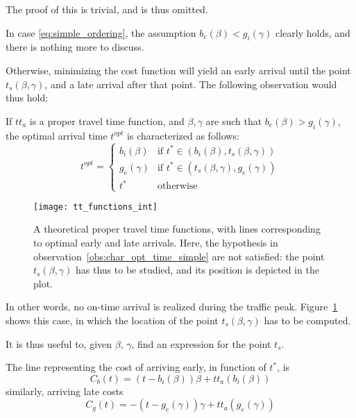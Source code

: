 The proof of this is trivial, and is thus omitted.

In case \eqref{eq:simple_ordering}, the assumption \(b_e(\beta) < g_i(\gamma)\) clearly holds, and there is nothing more to discuss.

Otherwise, minimizing the cost function will yield an early arrival until the point \(t_s(\beta, \gamma)\), and a late arrival after that point.
The following observation would thus hold:
\begin{obs}
  \label{obs:char_opt_time_comp}
  If \(tt_a\) is a proper travel time function, and \(\beta, \gamma\) are such that \(b_e(\beta) > g_i(\gamma)\), the optimal arrival time \(t^{opt}\) is characterized as follows:
  \begin{equation}
    t^{opt} =
    \begin{cases}
      b_i(\beta) & \text{if } t^*\in(b_i(\beta), t_s(\beta, \gamma)) \\
      g_e(\gamma) & \text{if } t^*\in(t_s(\beta, \gamma), g_e(\gamma)) \\
      t^* & \text{otherwise}
    \end{cases}
  \end{equation}
\end{obs}

\begin{figure}
  \centering
  \texttt{[image: tt\_functions\_int]}
  \caption{A theoretical proper travel time functions, with lines corresponding to optimal early and late arrivals.
    Here, the hypothesis in observation~\ref{obs:char_opt_time_simple} are not satisfied:
    the point \(t_s(\beta, \gamma)\) has thus to be studied,
  and its position is depicted in the plot.}
  \label{fig:tt_functions_int}
\end{figure}

In other words, no on-time arrival is realized during the traffic peak.
Figure~\ref{fig:tt_functions_int} shows this case, in which the location of the point \(t_s(\beta, \gamma)\) has to be computed.

It is thus useful to, given \(\beta\), \(\gamma\), find an expression for the point \(t_s\).

The line representing the cost of arriving early, in function of \(t^*\), is
\begin{equation*}
  C_b(t) = (t - b_i(\beta))\beta + tt_a(b_i(\beta))
\end{equation*}
similarly, arriving late costs
\begin{equation*}
  C_g(t) = -(t - g_e(\gamma))\gamma + tt_a(g_e(\gamma))
\end{equation*}

